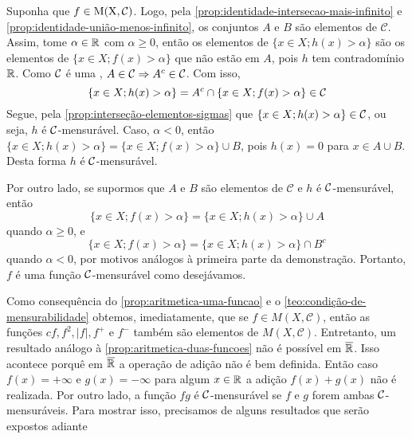 \begin{prova}
    Suponha que $f \in \operatorname{M(X, \mathcal{C} )}$. 
    Logo, pela \ref{prop:identidade-intersecao-mais-infinito} e \ref{prop:identidade-união-menos-infinito}, os conjuntos $A$ e $B$ são elementos de $\mathcal{C}$.
    Assim, tome $\alpha \in \mathbb{R}$ com $\alpha \geq 0$, então os elementos de $\{x \in X; h(x) > \alpha\}$ são os elementos de $\{x \in X; f(x) > \alpha\}$ que não estão em $A$, pois $h$ tem contradomínio $\mathbb{R}$.
    Como $\operatorname{\mathcal{C}}$ é uma \sigal\hspace{-0.1cm}, $A \in \operatorname{\mathcal{C}} \Rightarrow A^c \in \operatorname{\mathcal{C}}$. 
    Com isso, 
    \vspace{-0.2cm}
    $$
    \{x \in X; h(x) > \alpha\} = A^c\cap \{x \in X; f(x) > \alpha\} \in \cc
    \vspace{-0.2cm}
    $$
    Segue, pela  \ref{prop:interseção-elementos-sigmas} que $\{x \in X; h(x) > \alpha\} \in \operatorname{\mathcal{C}}$, ou seja, $h$ é $\operatorname{\mathcal{C}}$-mensurável.
    Caso, $\alpha < 0$, então $\{x \in X; h(x) > \alpha\} = \{x \in  X ; f(x) > \alpha\} \cup B $, pois $h(x) = 0$ para $x \in A \cup B$.
    Desta forma $h$ é $\operatorname{\mathcal{C}}$-mensurável.

    Por outro lado, se supormos que $A$ e $B$ são elementos de $\mathcal{C}$ e $h$ é $\operatorname{\mathcal{C}}$-mensurável, então
    $$\{x \in X; f(x) > \alpha\} = \{x \in  X ; h(x) > \alpha\} \cup A $$
    quando $\alpha \geq 0$, e 
    $$\{x \in X; f(x) > \alpha\} = \{x \in  X ; h(x) > \alpha\} \cap B^c $$
    quando  $\alpha < 0$, por motivos análogos à primeira parte da demonstração.
    Portanto, $f$ é uma função $\operatorname{\mathcal{C}}$-mensurável como desejávamos.
\end{prova}

Como consequência do \ref{prop:aritmetica-uma-funcao} e o \ref{teo:condição-de-mensurabilidade} obtemos, imediatamente, que se $ f \in M(X,\mathcal{C})$, então as funções $cf, f^2, |f|, f^+$ e $f^-$ também são elementos de $M(X, \mathcal{C})$.
Entretanto, um resultado análogo à \ref{prop:aritmetica-duas-funcoes} não é possível em $\operatorname{\overline{\mathbb{R}}}$.
Isso acontece porquê em $\operatorname{\overline{\mathbb{R}}}$ a operação de adição não é bem definida.
Então caso $f(x) = +\infty$ e $g(x) = -\infty$ para algum $x \in \mathbb{R}$ a adição
$f(x) + g(x)$ não é realizada.
Por outro lado, a função $fg$ é $\operatorname{\mathcal{C}}$-mensurável se $f$ e $g$ forem ambas $\operatorname{\mathcal{C}}$-mensuráveis.
Para mostrar isso, precisamos de alguns resultados que serão expostos adiante

